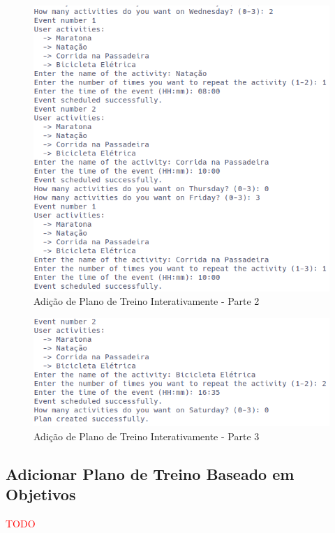 \documentclass[a4paper,12pt]{scrreprt}
\begin{document}
    \begin{figure}[!ht]
        \centering
        \includegraphics[width=\textwidth]{images/createPlan2.png}
        \caption{Adição de Plano de Treino Interativamente - Parte 2}
        \label{fig:add-plan-2}
    \end{figure}

    \begin{figure}[!ht]
        \centering
        \includegraphics[width=\textwidth]{images/createPlan3.png}
        \caption{Adição de Plano de Treino Interativamente - Parte 3}
        \label{fig:add-plan-3}
    \end{figure}

    \clearpage
    \subsection{Adicionar Plano de Treino Baseado em Objetivos}
    \textcolor{red}{TODO}
\end{document}
